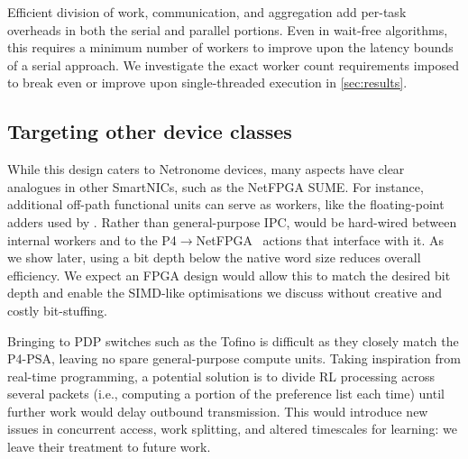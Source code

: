 Efficient division of work, communication, and aggregation add per-task overheads in both the serial and parallel portions.
Even in wait-free algorithms, this requires a minimum number of workers to improve upon the latency bounds of a serial approach.
We investigate the exact worker count requirements imposed to break even or improve upon single-threaded execution in \cref{sec:results}.

\subsection{Targeting other device classes}
While this design caters to Netronome devices, many aspects have clear analogues in other SmartNICs, such as the NetFPGA SUME.
For instance, additional off-path functional units can serve as workers, like the floating-point adders used by \textcite{DBLP:conf/isca/LiLYCSH19}.
Rather than general-purpose IPC, \approachshort{} would be hard-wired between internal workers and to the P4$\rightarrow$NetFPGA~\parencite{DBLP:conf/fpga/IbanezBMZ19} actions that interface with it.
As we show later, using a bit depth below the native word size reduces overall efficiency.
We expect an FPGA design would allow this to match the desired bit depth and enable the SIMD-like optimisations we discuss without creative and costly bit-stuffing.

Bringing \approachshort{} to PDP switches such as the Tofino is difficult as they closely match the P4-PSA, leaving no spare general-purpose compute units.
Taking inspiration from real-time programming, a potential solution is to divide RL processing across several packets (i.e., computing a portion of the preference list each time) until further work would delay outbound transmission.
This would introduce new issues in concurrent access, work splitting, and altered timescales for learning: we leave their treatment to future work.

